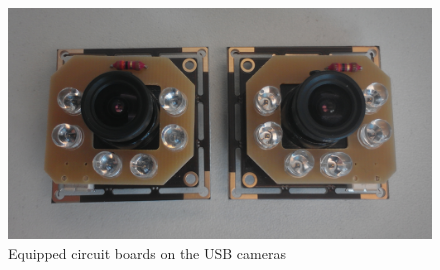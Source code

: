 \documentclass[../../Hardware_Guide]{subfiles}
\begin{document}
\begin{figure}[h]
	\centering
	\includegraphics[width=0.7\linewidth]{fertige_Platinen}
	\caption{Equipped circuit boards on the USB cameras}
	\label{fig:circuit03}
\end{figure}
\end{document}
